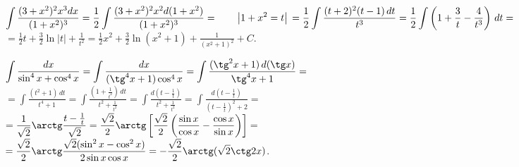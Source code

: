 \documentclass[a5paper,10pt]{article}
\begin{document}
\medskip
{} $\displaystyle\int\frac{(3+x^2)^2x^3dx}{(1+x^2)^3}=
\frac12\int\frac{(3+x^2)^2x^2d(1+x^2)}{(1+x^2)^3}=
\qquad\left|1+x^2=t\right|\qquad\\
=\frac12\int\frac{(t+2)^2(t-1)\,dt}{t^3}=
\frac12\int\left( 1+\frac{3}{t}-\frac{4}{t^3}\right)\,dt=$\\
$\displaystyle =\frac12t+\frac32\ln|t|+\frac{1}{t^2}=
\frac12x^2+\frac32\ln(x^2+1)+\frac{1}{(x^2+1)^2}+C$.

\medskip
{} $\displaystyle\int\frac{dx}{\sin^4x+\cos^4x}=
\int\frac{dx}{(\tg^4x+1)\cos^4x}=
\int\frac{(\tg^2x+1)\,d(\tg x)}{\tg^4x+1}=$\\
$\displaystyle =\int\frac{(t^2+1)\,dt}{t^4+1}=
\int\frac{\left(1+\frac{1}{t^2}\right)\,dt}{t^2+\frac{1}{t^2}}=
\int\frac{d\left(t-\frac{1}{t}\right)}{t^2+\frac{1}{t^2}}=
\int\frac{d\left(t-\frac{1}{t}\right)}{\left(t-\frac{1}{t}\right)^2+2}=$\\
$\displaystyle =\frac{1}{\sqrt2}\arctg\frac{t-\frac{1}{t}}{\sqrt2}=
\frac{\sqrt2}{2}\arctg\left[\frac{\sqrt2}{2}
\left(\frac{\sin x}{\cos x}-\frac{\cos x}{\sin x}\right)\right]=$\\
$\displaystyle =\frac{\sqrt2}{2}\arctg\frac{\sqrt2(\sin^2x-\cos^2x)}{2\sin x\cos x}=
-\frac{\sqrt2}{2}\arctg(\sqrt2\ctg2x)$.

\bigskip
{}
\end{document}
